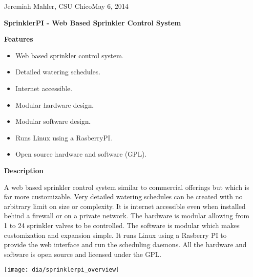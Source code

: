\documentclass{article}
\begin{document}
\noindent Jeremiah Mahler, CSU Chico\hfill May 6, 2014 \\
\vspace*{0.3in}
\centerline{\Large \textbf{SprinklerPI - Web Based Sprinkler Control System}}
\vspace{0.1in}
\hrulefill

\thispagestyle{empty}

{\large \textbf{Features}}
\begin{itemize}
\item Web based sprinkler control system.
\item Detailed watering schedules.
\item Internet accessible.
\item Modular hardware design.
\item Modular software design.
\item Runs Linux using a RasberryPI.
\item Open source hardware and software (GPL).
\end{itemize}

{\large \textbf{Description}}

A web based sprinkler control system similar to commercial offerings
but which is far more customizable.
Very detailed watering schedules can be created with no arbitrary limit
on size or complexity.
It is internet accessible even when installed behind a firewall or on
a private network.
The hardware is modular allowing from 1 to 24 sprinkler valves to be controlled.
The software is modular which makes customization and expansion simple.
It runs Linux using a Rasberry PI to provide the web interface and
run the scheduling daemons.
All the hardware and software is open source and licensed under the GPL.

\vspace{0.14in}

\begin{center}
\hspace{0.5in} \texttt{[image: dia/sprinklerpi\_overview]}
\end{center}

\hrulefill
\end{document}
